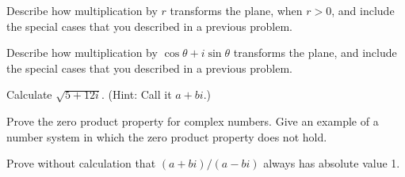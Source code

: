 \documentclass[space,nooutcomes]{ximera}
\begin{document}
\begin{problem}
Describe how multiplication by $r$ transforms the plane, when $r > 0$, and include the special cases that you described in a previous problem.  
\vfill 
\end{problem}

\newpage 


\begin{problem}
Describe how multiplication by $\cos\theta + i\sin\theta$ transforms the plane, and include the special cases that you described in a previous problem.
\vfill 
\end{problem}

\begin{problem}
Calculate $\sqrt{5+12i}$.  (Hint: Call it $a + bi$.)  
\vfill 
\end{problem}

\begin{problem}
Prove the zero product property for complex numbers.  Give an example of a number system in which the zero product property does not hold.
\vfill 
\end{problem}

\newpage 


\begin{problem}
Prove without calculation that $(a+bi)/(a-bi)$ always has absolute value 1.  
\vfill 
\end{problem}

%
%
%
%
\end{document}
